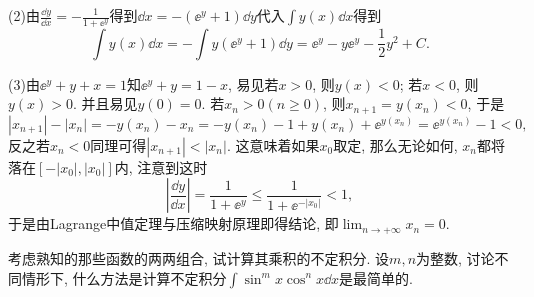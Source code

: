 \begin{quiza}
\begin{solution}
(2)由\(\frac{\dd y}{\dd x}=-\frac{1}{1+\ee^y}\)得到\(\dd x=-(\ee^y+1)\dd y\)代入\(\int y(x)\dd x\)得到\[\int y(x)\dd x=-\int y(\ee^y+1)\dd y=\ee^y-y\ee^y-\frac{1}{2}y^2+C.\]

(3)由\(\ee^y+y+x=1\)知\(\ee^y+y=1-x\), 易见若\(x>0\), 则\(y(x)<0\); 若\(x<0\), 则\(y(x)>0\). 并且易见\(y(0)=0\). 若\(x_n>0(n\geqslant 0)\), 则\(x_{n+1}=y(x_n)<0\), 于是\[|x_{n+1}|-|x_{n}|=-y(x_n)-x_n=-y(x_n)-1+y(x_n)+\ee^{y(x_n)}=\ee^{y(x_n)}-1<0,\]
反之若\(x_n<0\)同理可得\(|x_{n+1}|<|x_n|\). 这意味着如果\(x_0\)取定, 那么无论如何, \(x_n\)都将落在\(\left[-|x_0|,|x_0|\right]\)内, 注意到这时\[\left|\frac{\dd y}{\dd x}\right|=\frac{1}{1+\ee^y}\leqslant\frac{1}{1+\ee^{-|x_0|}}<1,\]于是由Lagrange中值定理与压缩映射原理即得结论, 即\(\lim_{n\rightarrow+\infty}x_n=0\).
\end{solution}
\end{quiza}
\begin{quizb}
\woe 考虑熟知的那些函数的两两组合, 试计算其乘积的不定积分.
\woe 设\(m,n\)为整数, 讨论不同情形下, 什么方法是计算不定积分\(\int\sin^m x\cos^nx\dd x\)是最简单的.
\end{quizb}
